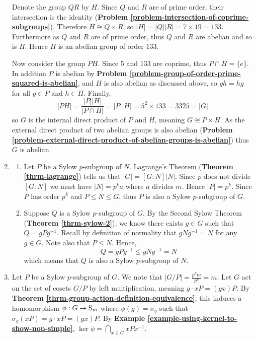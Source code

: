 \begin{enumerate}
    Denote the group $QR$ by $H$. Since $Q$ and $R$ are of prime order, their intersection is the identity (\textbf{Problem \ref{problem-intersection-of-coprime-subgroups}}). Therefore $H \cong Q \times R$, so $|H| = |Q||R| = 7 \times 19 = 133$. Furthermore as $Q$ and $R$ are of prime order, thus $Q$ and $R$ are abelian and so is $H$. Hence $H$ is an abelian group of order 133.

    Now consider the group $PH$. Since 5 and 133 are coprime, thus $P \cap H = \{e\}$. In addition $P$ is abelian by \textbf{Problem \ref{problem-group-of-order-prime-squared-is-abelian}}, and $H$ is also abelian as discussed above, so $gh = hg$ for all $g \in P$ and $h \in H$. Finally,
    \[
        |PH| = \frac{|P||H|}{|P \cap H|} = |P||H| = 5^2 \times 133 = 3325 = |G|
    \]
    so $G$ is the internal direct product of $P$ and $H$, meaning $G \cong P \times H$. As the external direct product of two abelian groups is also abelian (\textbf{Problem \ref{problem-external-direct-product-of-abelian-groups-is-abelian}}) thus $G$ is abelian.

    \item \begin{enumerate}[label=(\roman*)]
        \item Let $P$ be a Sylow $p$-subgroup of $N$. Lagrange's Theorem (\textbf{Theorem \ref{thrm-lagrange}}) tells us that $|G| = [G:N]|N|$. Since $p$ does not divide $[G:N]$ we must have $|N| = p^ka$ where $a$ divides $m$. Hence $|P| = p^k$. Since $P$ has order $p^k$ and $P \leq N \leq G$, thus $P$ is also a Sylow $p$-subgroup of $G$.
        \item Suppose $Q$ is a Sylow $p$-subgroup of $G$. By the Second Sylow Theorem (\textbf{Theorem \ref{thrm-sylow-2}}), we know there exists $g \in G$ such that $Q = gPg^{-1}$. Recall by definition of normality that $gNg^{-1} = N$ for any $g \in G$. Note also that $P \leq N$. Hence,
        \[
            Q = gPg^{-1} \leq gNg^{-1} = N
        \]
        which means that $Q$ is also a Sylow $p$-subgroup of $N$.
    \end{enumerate}

    \item Let $P$ be a Sylow $p$-subgroup of $G$. We note that $|G/P| = \frac{p^km}{p^k} = m$. Let $G$ act on the set of cosets $G/P$ by left multiplication, meaning $g\cdot xP = (gx)P$. By \textbf{Theorem \ref{thrm-group-action-definition-equivalence}}, this induces a homomorphism $\phi: G \to \mathrm{S}_{m}$ where $\phi(g) = \sigma_g$ such that $\sigma_g(xP) = g\cdot xP = (gx)P$. By \textbf{Example \ref{example-using-kernel-to-show-non-simple}}, $\ker\phi = \bigcap_{x \in G}xPx^{-1}$.
    

\end{enumerate}
